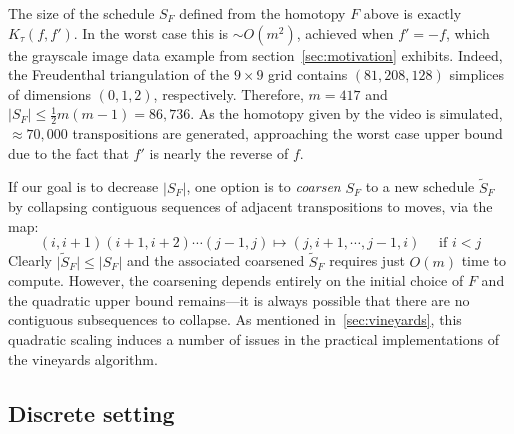 \documentclass[sn-mathphys]{sn-jnl}
\begin{document}
The size of the schedule $S_F$ defined from the homotopy $F$ above 
is exactly $K_\tau(f,f')$. In the worst case this
is $\sim O(m^2)$, achieved when $f' = - f$, which the grayscale image data example from section~\ref{sec:motivation} exhibits. 
Indeed,  the Freudenthal triangulation of the $9\times 9$ grid contains $(81, 208, 128)$ simplices of dimensions $(0, 1, 2)$, respectively. 
Therefore, $m = 417$ and $\lvert S_F \rvert \leq \frac{1}{2}m(m-1) = 86,736$.
As the homotopy given by the video is simulated,  $\approx 70,\!000$ transpositions are generated, approaching the worst case upper bound due to the fact that $f'$  is nearly the reverse of $f$.  

If our goal is to decrease  $\lvert S_F \rvert$, one option is to \emph{coarsen} $S_F$ to a new schedule $\widetilde{S}_F$ by collapsing contiguous sequences of adjacent transpositions to moves, via the map:
\begin{equation}\label{eq:tr_to_mv}
	 (i, i+1)(i+1, i+2)\cdots(j-1, j) \mapsto (j, i+1, \cdots, j-1, i)  \quad \text{ if } i < j
\end{equation}
Clearly $\lvert \widetilde{S}_F \rvert \leq \lvert S_F \rvert$ and the associated coarsened $\widetilde{S}_F$ requires just $O(m)$ time to compute. However, the coarsening depends entirely on the initial choice of $F$ and the quadratic upper bound remains---it is always possible that there are no contiguous subsequences to collapse. 
As mentioned in~\ref{sec:vineyards}, this quadratic scaling induces a number of issues in the practical implementations of the vineyards algorithm.



\subsection{Discrete setting}\label{sec:moves_setting}

\end{document}
